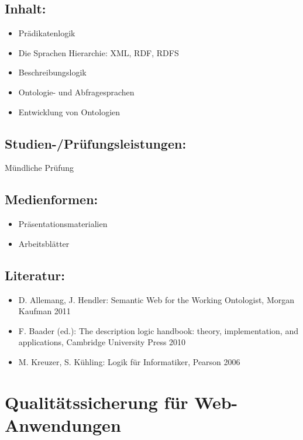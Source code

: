 \section*{Inhalt:}\label{inhalt-20}

\begin{itemize}
\item
  Prädikatenlogik
\item
  Die Sprachen Hierarchie: XML, RDF, RDFS
\item
  Beschreibungslogik
\item
  Ontologie- und Abfragesprachen
\item
  Entwicklung von Ontologien
\end{itemize}

\section*{Studien-/Prüfungsleistungen:}\label{studien-pruxfcfungsleistungen-20}

Mündliche Prüfung

\section*{Medienformen:}\label{medienformen-20}

\begin{itemize}
\item
  Präsentationsmaterialien
\item
  Arbeitsblätter
\end{itemize}

\section*{Literatur:}\label{literatur-17}

\begin{itemize}
\item
  D. Allemang, J. Hendler: Semantic Web for the Working Ontologist,
  Morgan Kaufman 2011
\item
  F. Baader (ed.): The description logic handbook: theory,
  implementation, and applications, Cambridge University Press 2010
\item
  M. Kreuzer, S. Kühling: Logik für Informatiker, Pearson 2006
\end{itemize}

\chapter{Qualitätssicherung für
Web-Anwendungen}\label{qualituxe4tssicherung-fuxfcr-web-anwendungen}

